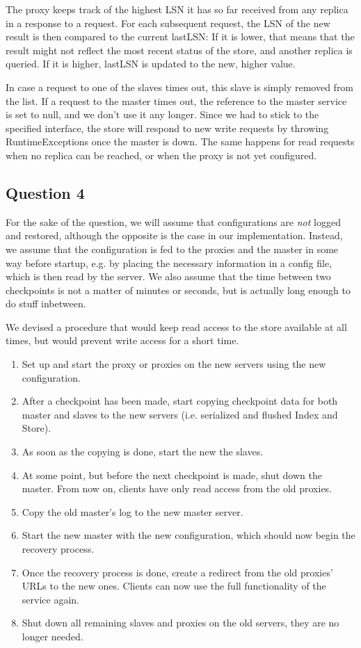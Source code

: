 \documentclass[12pt,a4paper,fleqn]{article}
\begin{document}
The proxy keeps track of the highest LSN it has so far received from any replica in a response to a request. For each subsequent request, the LSN of the new result is then compared to the current lastLSN: If it is lower, that means that the result might not reflect the most recent status of the store, and another replica is queried. If it is higher, lastLSN is updated to the new, higher value. 

In case a request to one of the slaves times out, this slave is simply removed from the list. If a request to the master times out, the reference to the master service is set to null, and we don't use it any longer. Since we had to stick to the specified interface, the store will respond to new write requests by throwing RuntimeExceptions once the master is down. The same happens for read requests when no replica can be reached, or when the proxy is not yet configured.

\subsection*{Question 4}
\label{sec:pq4}
For the sake of the question, we will assume that configurations are \emph{not} logged and restored, although the opposite is the case in our implementation. Instead, we assume that the configuration is fed to the proxies and the master in some way before startup, e.g. by placing the necessary information in a config file, which is then read by the server. We also assume that the time between two checkpoints is not a matter of minutes or seconds, but is actually long enough to do stuff inbetween.

We devised a procedure that would keep read access to the store available at all times, but would prevent write access for a short time. 
\begin{enumerate}
  \item Set up and start the proxy or proxies on the new servers using the new configuration.
  \item After a checkpoint has been made, start copying checkpoint data for both master and slaves to the new servers (i.e. serialized and flushed Index and Store).
  \item As soon as the copying is done, start the new the slaves.
  \item At some point, but before the next checkpoint is made, shut down the master. From now on, clients have only read access from the old proxies. \label{writestop}
  \item Copy the old master's log to the new master server.
  \item Start the new master with the new configuration, which should now begin the recovery process. \label{writestart}
  \item Once the recovery process is done, create a redirect from the old proxies' URLs to the new ones. Clients can now use the full functionality of the service again. 
  \item Shut down all remaining slaves and proxies on the old servers, they are no longer needed.
\end{enumerate}
\end{document}
